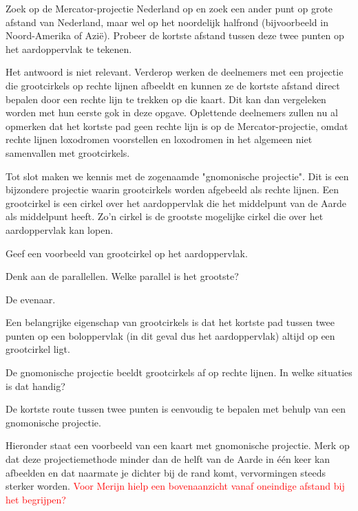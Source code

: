 \begin{opgave}
	Zoek op de Mercator-projectie Nederland op en zoek een ander punt op grote afstand van Nederland, maar wel op het noordelijk halfrond (bijvoorbeeld in Noord-Amerika of Azi\"e). Probeer de kortste afstand tussen deze twee punten op het aardoppervlak te tekenen.
	\begin{antwoord}
		Het antwoord is niet relevant. Verderop werken de deelnemers met een projectie die grootcirkels op rechte lijnen afbeeldt en kunnen ze de kortste afstand direct bepalen door een rechte lijn te trekken op die kaart. Dit kan dan vergeleken worden met hun eerste gok in deze opgave. Oplettende deelnemers zullen nu al opmerken dat het kortste pad geen rechte lijn is op de Mercator-projectie, omdat rechte lijnen loxodromen voorstellen en loxodromen in het algemeen niet samenvallen met grootcirkels.
	\end{antwoord}
\end{opgave}

Tot slot maken we kennis met de zogenaamde "gnomonische projectie". Dit is een bijzondere projectie waarin grootcirkels worden afgebeeld als rechte lijnen. Een grootcirkel is een cirkel over het aardoppervlak die het middelpunt van de Aarde als middelpunt heeft. Zo'n cirkel is de grootste mogelijke cirkel die over het aardoppervlak kan lopen.

\begin{opgave}
	Geef een voorbeeld van grootcirkel op het aardoppervlak.
	\begin{hint}
		Denk aan de parallellen. Welke parallel is het grootste?
	\end{hint}
	\begin{antwoord}
		De evenaar.
	\end{antwoord}
\end{opgave}

Een belangrijke eigenschap van grootcirkels is dat het kortste pad tussen twee punten op een boloppervlak (in dit geval dus het aardoppervlak) altijd op een grootcirkel ligt.

\begin{opgave}
	De gnomonische projectie beeldt grootcirkels af op rechte lijnen. In welke situaties is dat handig?
	\begin{antwoord}
		De kortste route tussen twee punten is eenvoudig te bepalen met behulp van een gnomonische projectie.
	\end{antwoord}
\end{opgave}

Hieronder staat een voorbeeld van een kaart met gnomonische projectie. Merk op dat deze projectiemethode minder dan de helft van de Aarde in \'e\'en keer kan afbeelden en dat naarmate je dichter bij de rand komt, vervormingen steeds sterker worden. \textcolor{red}{Voor Merijn hielp een bovenaanzicht vanaf oneindige afstand bij het begrijpen?}

